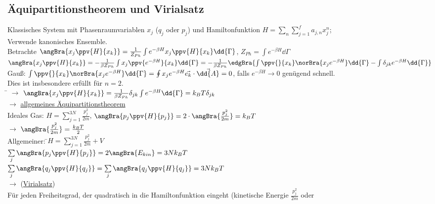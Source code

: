 \subsection{Äquipartitionstheorem und Virialsatz}
\begin{tabbing}
Klassisches System mit Phasenraumvariablen $x_j$ ($q_j$ oder $p_j$) und Hamiltonfunktion $H = \sum\limits_n \sum\limits_{j=1}^f a_{j,n} x_j^n$;\\
Verwende kanonisches Ensemble.\\
Betrachte $\angBra{x_j \ppv{H}{x_k}} = \frac{1}{Z_{Ph}}\int e^{-\beta H} x_j \ppv{H}{x_k} \dd{\Gamma}$, $Z_{Ph} = \int e^{-\beta H} \dd{\Gamma}$\\
$\angBra{x_j \ppv{H}{x_k}} = - \frac{1}{\beta Z_{Ph}} \int x_j \ppv{e^{-\beta H}}{x_k} \dd{\Gamma} = - \frac{1}{\beta Z_{Ph}}\edgBra{\int \ppv{}{x_k} \norBra{x_j e^{-\beta H}}\dd{\Gamma} - \int \delta_{jk}e^{-\beta H} \dd{\Gamma}}$\\
Gauß: $\int \ppv{}{x_k} \norBra{x_j e^{-\beta H}}\dd{\Gamma} = \oint x_j e^{-\beta H} \vec{e_k}\cdot \vec{\dd{A}} = 0$, falls $e^{-\beta H} \to 0$ genügend schnell.\\
Dies ist insbesondere erfüllt für $n=2$.\\
\hspace{4em} \= \kill
$\rightarrow$\> $\angBra{x_j \ppv{H}{x_k}} = \frac{1}{\beta Z_{Ph}} \delta_{jk} \int e^{-\beta H} \dd{\Gamma} = k_B T \delta_{jk}$\\
$\rightarrow$\>  \uline{allgemeines Äquipartitionstheorem}\\
Ideales Gas: $H = \sum\limits_{j=1}^{3N} \frac{p_j^2}{2 m}$, $\angBra{p_j\ppv{H}{p_j}} = 2\cdot \angBra{\frac{p_j^2}{2 m}} = k_B T$\\
$\rightarrow$\> $\angBra{\frac{p_j^2}{2 m}} = \frac{k_B T}{2}$\\
Allgemeiner: \=$H = \sum\limits_{j=1}^{3N} \frac{p_j^2}{2 m} + V$\\
\> $\sum\limits_j \angBra{p_j\ppv{H}{p_j}} = 2 \angBra{E_{kin}} = 3 N k_B T$\\
\> $\sum\limits_j \angBra{q_j\ppv{H}{q_j}} = \sum\limits_j \angBra{q_j\ppv{H}{q_j}} = 3 N k_B T$\\
$\rightarrow$\>  (\uline{Virialsatz})\\
Für jeden Freiheitsgrad, der quadratisch in die Hamiltonfunktion eingeht (kinetische Energie $\frac{p_j^2}{2 m}$ oder\\

\end{tabbing}
